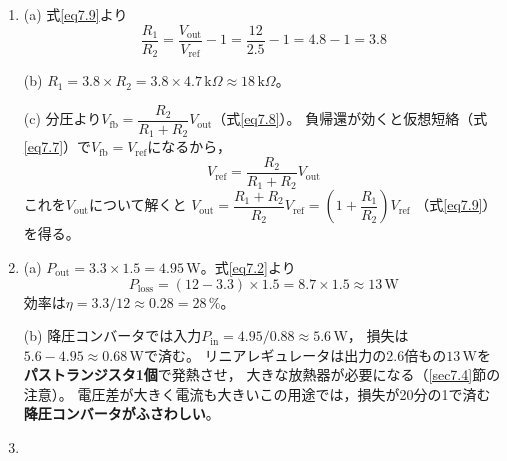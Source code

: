 \begin{enumerate}
\item[\ref{ex7.4}]
(a) 式\ref{eq7.9}より
\begin{equation*}
\frac{R_1}{R_2} = \frac{V_{\mathrm{out}}}{V_{\mathrm{ref}}} - 1
= \frac{12}{2.5} - 1 = 4.8 - 1 = 3.8
\end{equation*}

(b) $R_1 = 3.8 \times R_2 = 3.8 \times 4.7\,\mathrm{k}\Omega \approx 18\,\mathrm{k}\Omega$。

(c) 分圧より$V_{\mathrm{fb}} = \dfrac{R_2}{R_1+R_2}V_{\mathrm{out}}$（式\ref{eq7.8}）。
負帰還が効くと仮想短絡（式\ref{eq7.7}）で$V_{\mathrm{fb}} = V_{\mathrm{ref}}$になるから，
\begin{equation*}
V_{\mathrm{ref}} = \frac{R_2}{R_1+R_2}V_{\mathrm{out}}
\end{equation*}
これを$V_{\mathrm{out}}$について解くと
$V_{\mathrm{out}} = \dfrac{R_1+R_2}{R_2}V_{\mathrm{ref}} = \left(1+\dfrac{R_1}{R_2}\right)V_{\mathrm{ref}}$
（式\ref{eq7.9}）を得る。

\item[\ref{ex7.5}]
(a) $P_{\mathrm{out}} = 3.3\times1.5 = 4.95$\,W。式\ref{eq7.2}より
\begin{equation*}
P_{\mathrm{loss}} = (12 - 3.3)\times1.5 = 8.7\times1.5 \approx 13\,\mathrm{W}
\end{equation*}
効率は$\eta = 3.3/12 \approx 0.28 = 28\,\%$。

(b) 降圧コンバータでは入力$P_{\mathrm{in}} = 4.95/0.88 \approx 5.6$\,W，
損失は$5.6 - 4.95 \approx 0.68$\,Wで済む。
リニアレギュレータは出力の$2.6$倍もの$13$\,Wを\textbf{パストランジスタ1個}で発熱させ，
大きな放熱器が必要になる（\ref{sec7.4}節の注意）。
電圧差が大きく電流も大きいこの用途では，損失が20分の1で済む\textbf{降圧コンバータがふさわしい}。

\item[\ref{ex7.6}]


\end{enumerate}
